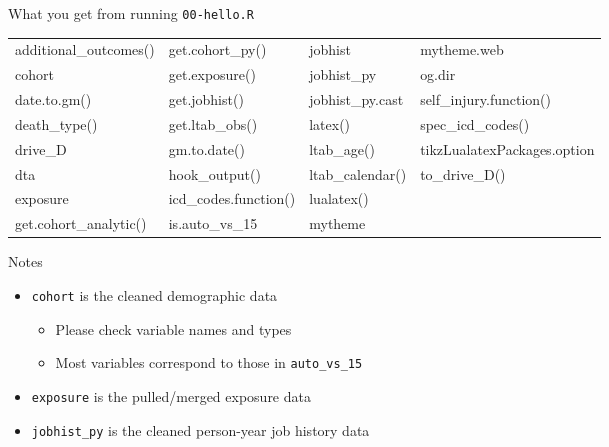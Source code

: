 \documentclass[
  ignorenonframetext,
  aspectratio=169,
]{beamer}
\providecommand{\tightlist}{%
  \setlength{\itemsep}{0pt}\setlength{\parskip}{0pt}}
\begin{document}
\begin{frame}[fragile]{What you get from running \texttt{00-hello.R}}
\protect\hypertarget{what-you-get-from-running-00-hello.r}{}

\begin{center}\begin{adjustbox}{max width = 0.85\linewidth}\ttfamily
\begin{tabular}{llll}
  \toprule
additional\_outcomes() & get.cohort\_py() & jobhist & mytheme.web \\ 
  cohort & get.exposure() & jobhist\_py & og.dir \\ 
  date.to.gm() & get.jobhist() & jobhist\_py.cast & self\_injury.function() \\ 
  death\_type() & get.ltab\_obs() & latex() & spec\_icd\_codes() \\ 
  drive\_D & gm.to.date() & ltab\_age() & tikzLualatexPackages.option \\ 
  dta & hook\_output() & ltab\_calendar() & to\_drive\_D() \\ 
  exposure & icd\_codes.function() & lualatex()  \\ 
  get.cohort\_analytic() & is.auto\_vs\_15 & mytheme  \\ 
   \bottomrule
\end{tabular}
\end{adjustbox}\end{center}

Notes

\begin{itemize}
\tightlist
\item
  \texttt{cohort} is the cleaned demographic data

  \begin{itemize}
  \tightlist
  \item
    Please check variable names and types
  \item
    Most variables correspond to those in \texttt{auto\_vs\_15}
  \end{itemize}
\item
  \texttt{exposure} is the pulled/merged exposure data
\item
  \texttt{jobhist\_py} is the cleaned person-year job history data
\end{itemize}

\end{frame}
\end{document}
